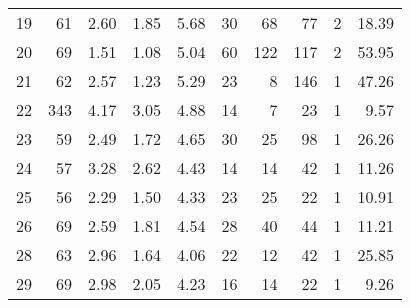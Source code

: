 \begin{tabular}{rrrrrrrrrr}
19 &       61 &                             2.60 &                             1.85 &                             5.68 &              30 &              68 &                        77 &          2 &                        18.39 \\
20 &       69 &                             1.51 &                             1.08 &                             5.04 &              60 &             122 &                       117 &          2 &                        53.95 \\
21 &       62 &                             2.57 &                             1.23 &                             5.29 &              23 &               8 &                       146 &          1 &                        47.26 \\
22 &      343 &                             4.17 &                             3.05 &                             4.88 &              14 &               7 &                        23 &          1 &                         9.57 \\
23 &       59 &                             2.49 &                             1.72 &                             4.65 &              30 &              25 &                        98 &          1 &                        26.26 \\
24 &       57 &                             3.28 &                             2.62 &                             4.43 &              14 &              14 &                        42 &          1 &                        11.26 \\
25 &       56 &                             2.29 &                             1.50 &                             4.33 &              23 &              25 &                        22 &          1 &                        10.91 \\
26 &       69 &                             2.59 &                             1.81 &                             4.54 &              28 &              40 &                        44 &          1 &                        11.21 \\
28 &       63 &                             2.96 &                             1.64 &                             4.06 &              22 &              12 &                        42 &          1 &                        25.85 \\
29 &       69 &                             2.98 &                             2.05 &                             4.23 &              16 &              14 &                        22 &          1 &                         9.26 \\

\end{tabular}
